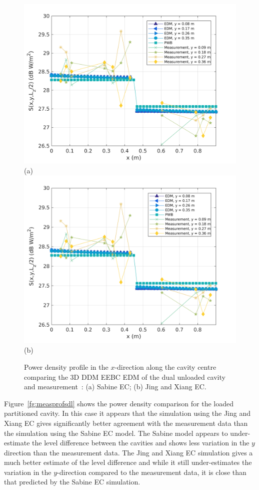 \documentclass[a4paper]{article}
\numberwithin{equation}{section}
\newcounter{Figure}
\begin{document}
\begin{figure}[hp]
\begin{center}
\includegraphics[width=0.6\linewidth]{figures/DDM-EEBC_3D_DU_PowerDensityProfileXMeas}\\
{\footnotesize (a)}\\
\vspace{2mm}
\includegraphics[width=0.6\linewidth]{figures/DDM-EEBC_3D_DU_PowerDensityProfileXMeas_JX}\\
{\footnotesize (b)}\\
\vspace{-2mm}
\caption{\label{fg:measprofsdu} Power density profile in the $x$-direction along the cavity centre comparing
the 3D DDM EEBC EDM of the dual unloaded cavity and measurement~\citep{Flintoft2017b}: (a) Sabine EC; (b) Jing and Xiang EC.}
\end{center}
\end{figure}

Figure~\ref{fg:measprofsdl} shows the power density comparison for the loaded partitioned cavity. In this case it appears
that the simulation using the Jing and Xiang EC gives significantly better agreement with the measurement data than
the simulation using the Sabine EC model. The Sabine model appears to under-estimate the level difference between
the cavities and shows less variation in the $y$ direction than the measurement data. The Jing and Xiang EC simulation 
gives a much better estimate of the level difference and while it still under-estimates the variation in the $y$-direction
compared to the measurement data, it is close than that predicted by the Sabine EC simulation.
\end{document}
